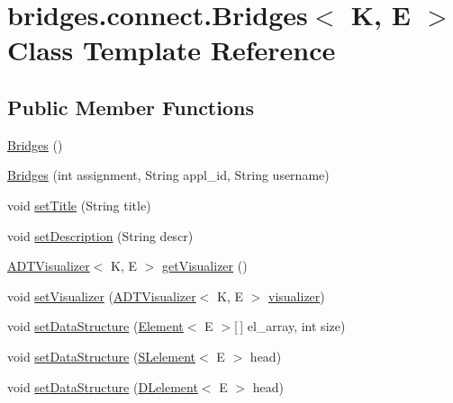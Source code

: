 \hypertarget{classbridges_1_1connect_1_1_bridges}{}\section{bridges.\+connect.\+Bridges$<$ K, E $>$ Class Template Reference}
\label{classbridges_1_1connect_1_1_bridges}
\subsection*{Public Member Functions}
\begin{DoxyCompactItemize}
\item 
\hyperlink{classbridges_1_1connect_1_1_bridges_a4925cf146eff9ff84e89351ab574795d}{Bridges} ()
\item 
\hyperlink{classbridges_1_1connect_1_1_bridges_a297e7ca95c725fa20bce0768c2d9aa64}{Bridges} (int assignment, String appl\+\_\+id, String username)
\item 
void \hyperlink{classbridges_1_1connect_1_1_bridges_a90c7f6b2b99d88bf241ea7247db47045}{set\+Title} (String title)
\item 
void \hyperlink{classbridges_1_1connect_1_1_bridges_a161206b37c2acdf435f4444679616eec}{set\+Description} (String descr)
\item 
\hyperlink{classbridges_1_1base_1_1_a_d_t_visualizer}{A\+D\+T\+Visualizer}$<$ K, E $>$ \hyperlink{classbridges_1_1connect_1_1_bridges_a7193b48c9dc01b04dfcf0d66fa2f59fb}{get\+Visualizer} ()
\item 
void \hyperlink{classbridges_1_1connect_1_1_bridges_ad627f604914734646e92fac9e7b385d8}{set\+Visualizer} (\hyperlink{classbridges_1_1base_1_1_a_d_t_visualizer}{A\+D\+T\+Visualizer}$<$ K, E $>$ \hyperlink{classbridges_1_1connect_1_1_bridges_af3fc35779b31c976ed8bf2e173310502}{visualizer})
\item 
void \hyperlink{classbridges_1_1connect_1_1_bridges_a0cc12a419997a8ef0ef54afe9e65d1e9}{set\+Data\+Structure} (\hyperlink{classbridges_1_1base_1_1_element}{Element}$<$ E $>$\mbox{[}$\,$\mbox{]} el\+\_\+array, int size)
\item 
void \hyperlink{classbridges_1_1connect_1_1_bridges_ae41b3d86963350ace304d8951c1863ad}{set\+Data\+Structure} (\hyperlink{classbridges_1_1base_1_1_s_lelement}{S\+Lelement}$<$ E $>$ head)
\item 
void \hyperlink{classbridges_1_1connect_1_1_bridges_a383877f85bb048d47560e76f359e1bda}{set\+Data\+Structure} (\hyperlink{classbridges_1_1base_1_1_d_lelement}{D\+Lelement}$<$ E $>$ head)

\end{DoxyCompactItemize}

